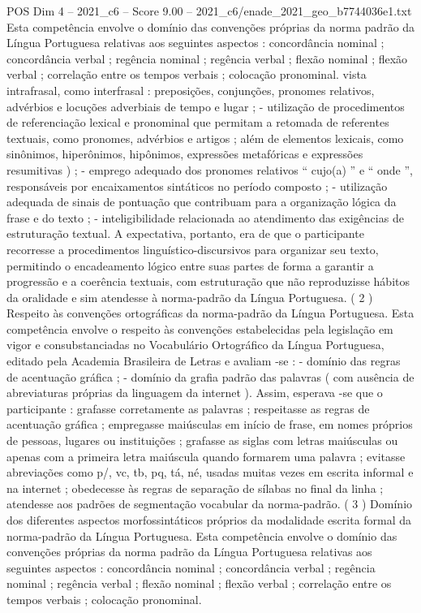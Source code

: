 \begin{textsample}{POS Dim 4 – 2021\_c6 – Score 9.00 – 2021\_c6/enade\_2021\_geo\_b7744036e1.txt}
Esta competência envolve o domínio das convenções próprias da norma padrão da Língua Portuguesa relativas aos seguintes aspectos : concordância nominal ; concordância verbal ; regência nominal ; regência verbal ; flexão nominal ; flexão verbal ; correlação entre os tempos verbais ; colocação pronominal. vista intrafrasal, como interfrasal : preposições, conjunções, pronomes relativos, advérbios e locuções adverbiais de tempo e lugar ; - utilização de procedimentos de referenciação lexical e pronominal que permitam a retomada de referentes textuais, como pronomes, advérbios e artigos ; além de elementos lexicais, como sinônimos, hiperônimos, hipônimos, expressões metafóricas e expressões resumitivas ) ; - emprego adequado dos pronomes relativos “ cujo(a) ” e “ onde ”, responsáveis por encaixamentos sintáticos no período composto ; - utilização adequada de sinais de pontuação que contribuam para a organização lógica da frase e do texto ; - inteligibilidade relacionada ao atendimento das exigências de estruturação textual.
A expectativa, portanto, era de que o participante recorresse a procedimentos linguístico-discursivos para organizar seu texto, permitindo o encadeamento lógico entre suas partes de forma a garantir a progressão e a coerência textuais, com estruturação que não reproduzisse hábitos da oralidade e sim atendesse à norma-padrão da Língua Portuguesa. ( 2 ) Respeito às convenções ortográficas da norma-padrão da Língua Portuguesa.
Esta competência envolve o respeito às convenções estabelecidas pela legislação em vigor e consubstanciadas no Vocabulário Ortográfico da Língua Portuguesa, editado pela Academia Brasileira de Letras e avaliam -se : - domínio das regras de acentuação gráfica ; - domínio da grafia padrão das palavras ( com ausência de abreviaturas próprias da linguagem da internet ).
Assim, esperava -se que o participante : grafasse corretamente as palavras ; respeitasse as regras de acentuação gráfica ; empregasse maiúsculas em início de frase, em nomes próprios de pessoas, lugares ou instituições ; grafasse as siglas com letras maiúsculas ou apenas com a primeira letra maiúscula quando formarem uma palavra ; evitasse abreviações como p/, vc, tb, pq, tá, né, usadas muitas vezes em escrita informal e na internet ; obedecesse às regras de separação de sílabas no final da linha ; atendesse aos padrões de segmentação vocabular da norma-padrão. ( 3 ) Domínio dos diferentes aspectos morfossintáticos próprios da modalidade escrita formal da norma-padrão da Língua Portuguesa.
Esta competência envolve o domínio das convenções próprias da norma padrão da Língua Portuguesa relativas aos seguintes aspectos : concordância nominal ; concordância verbal ; regência nominal ; regência verbal ; flexão nominal ; flexão verbal ; correlação entre os tempos verbais ; colocação pronominal.

\end{textsample}
